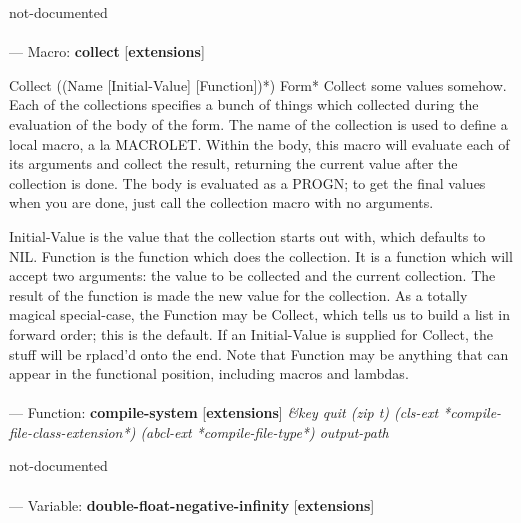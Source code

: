 \begin{adjustwidth}{5em}{5em}
not-documented
\end{adjustwidth}

\paragraph{}
\label{EXTENSIONS:COLLECT}
--- Macro: \textbf{collect} [\textbf{extensions}] \textit{}

\begin{adjustwidth}{5em}{5em}
Collect ({(Name [Initial-Value] [Function])}*) {Form}*
  Collect some values somehow.  Each of the collections specifies a bunch of
  things which collected during the evaluation of the body of the form.  The
  name of the collection is used to define a local macro, a la MACROLET.
  Within the body, this macro will evaluate each of its arguments and collect
  the result, returning the current value after the collection is done.  The
  body is evaluated as a PROGN; to get the final values when you are done, just
  call the collection macro with no arguments.

  Initial-Value is the value that the collection starts out with, which
  defaults to NIL.  Function is the function which does the collection.  It is
  a function which will accept two arguments: the value to be collected and the
  current collection.  The result of the function is made the new value for the
  collection.  As a totally magical special-case, the Function may be Collect,
  which tells us to build a list in forward order; this is the default.  If an
  Initial-Value is supplied for Collect, the stuff will be rplacd'd onto the
  end.  Note that Function may be anything that can appear in the functional
  position, including macros and lambdas.
\end{adjustwidth}

\paragraph{}
\label{EXTENSIONS:COMPILE-SYSTEM}
--- Function: \textbf{compile-system} [\textbf{extensions}] \textit{\&key quit (zip t) (cls-ext *compile-file-class-extension*) (abcl-ext *compile-file-type*) output-path}

\begin{adjustwidth}{5em}{5em}
not-documented
\end{adjustwidth}

\paragraph{}
\label{EXTENSIONS:DOUBLE-FLOAT-NEGATIVE-INFINITY}
--- Variable: \textbf{double-float-negative-infinity} [\textbf{extensions}] \textit{}

